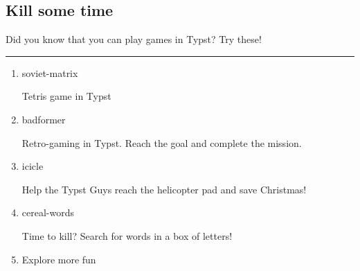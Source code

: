 \subsection{Kill some time}\label{kill-some-time}

Did you know that you can play games in Typst? Try these!

\begin{center}\rule{0.5\linewidth}{0.5pt}\end{center}

\begin{enumerate}
\item
  \href{https://typst.app/universe/package/soviet-matrix/}{}

  

  soviet-matrix

  Tetris game in Typst
\item
  \href{https://typst.app/universe/package/badformer/}{}

  

  badformer

  Retro-gaming in Typst. Reach the goal and complete the mission.
\item
  \href{https://typst.app/universe/package/icicle/}{}

  

  icicle

  Help the Typst Guys reach the helicopter pad and save Christmas!
\item
  \href{https://typst.app/universe/package/cereal-words/}{}

  

  cereal-words

  Time to kill? Search for words in a box of letters!
\item
  \href{/universe/search/?category=fun}{}

  Explore more fun
\end{enumerate}


